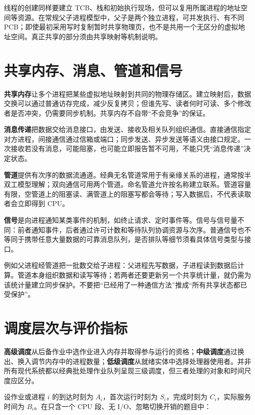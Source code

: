 线程的创建同样要建立 TCB、栈和初始执行现场，但可以复用所属进程的地址空间等资源。在常规父子进程模型中，父子是两个独立进程，可并发执行、有不同 PCB；即使最初采用写时复制暂时共享物理页，也不是共用一个无区分的虚拟地址空间。真正共享的部分须由共享映射等机制说明。

\section{共享内存、消息、管道和信号}\label{os-2-5}

\textbf{共享内存}让多个进程把某些虚拟地址映射到共同的物理存储区。建立映射后，数据交换可以通过普通访存完成，减少反复拷贝；但谁先写、读者何时可读、多个修改者是否冲突，仍需要同步机制。共享内存不自带``不会竞争''的保证。

\textbf{消息传递}把数据交给消息接口，由发送、接收及相关队列组织通信。直接通信指定对方进程，间接通信通过信箱或端口；同步发送、异步发送等语义由接口规定。一次接收若没有消息，可能阻塞，也可能立即报告暂不可用，不能只凭``消息传递''决定状态。

\textbf{管道}提供有次序的数据流通道。经典无名管道常用于有亲缘关系的进程，通常按半双工模型理解；双向通信可用两个管道。命名管道允许按名称建立联系。管道容量有限，空管道上的阻塞读、满管道上的阻塞写都会等待；写入数据后，不代表读取者会立即得到 CPU。

\textbf{信号}是向进程通知某类事件的机制，如终止请求、定时事件等。信号与信号量不同：前者通知事件，后者通过许可计数和等待队列协调资源与次序。普通信号也不等同于携带任意大量数据的可靠消息队列，是否排队等细节须看具体信号类型与接口。

例如父进程经管道把一批数交给子进程：父进程先写数据，子进程读到数据后计算。管道本身组织数据和读写等待；若两者还要更新另一个共享统计量，就仍需为该统计量建立同步保护。不要把``已经用了一种通信方法''推成``所有共享状态都已受保护''。

\section{调度层次与评价指标}\label{os-2-6}

\textbf{高级调度}从后备作业中选作业进入内存并取得参与运行的资格；\textbf{中级调度}通过换出、换入调节内存中的进程数量；\textbf{低级调度}从就绪实体中选择处理器使用者。并非所有现代系统都以经典批处理作业队列呈现三级调度，但三者处理的对象和时间尺度应区分。

设作业或进程 \(i\) 的到达时刻为 \(A_i\)，首次运行时刻为 \(S_i\)，完成时刻为 \(C_i\)，实际服务时间为 \(B_i\)。在只含一个 CPU 段、无 I/O、忽略切换开销的题目中：

